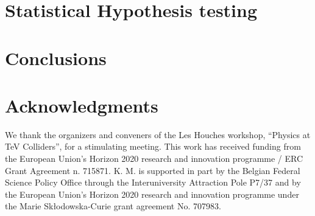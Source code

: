 \documentclass[11pt]{cernrep}
\begin{document}
\section{Statistical Hypothesis testing}
\label{sec:test}



\section{Conclusions}
\label{sec:conclusions}




\section*{Acknowledgments}

We thank the organizers and conveners of the Les Houches workshop, ``Physics
at TeV Colliders'', for a stimulating meeting. This work has received funding from the European Union's Horizon 2020 research and innovation programme / ERC Grant Agreement n. 715871. K. M. is supported in part by the Belgian Federal Science Policy Office through the Interuniversity Attraction Pole P7/37 and by the European Union’s Horizon 2020 research and innovation programme under the Marie Sk\l{}odowska-Curie grant agreement No. 707983.






%
\end{document}
